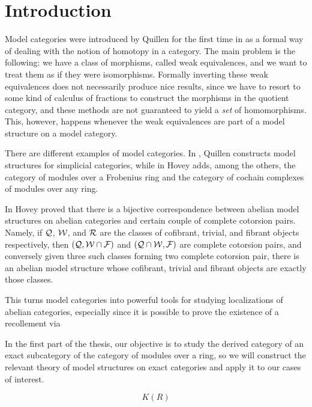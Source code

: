\chapter{Introduction}\label{ch:introduction}

Model categories were introduced by Quillen for the first time in \cite{Q} as a formal way of dealing with the notion of homotopy in a category. The main problem is the following: we have a class of morphisms, called weak equivalences, and we want to treat them as if they were isomorphisms. Formally inverting these weak equivalences does not necessarily produce nice results, since we have to resort to some kind of calculus of fractions to construct the morphisms in the quotient category, and these methods are not guaranteed to yield a \emph{set} of homomorphisms. This, however, happens whenever the weak equivalences are part of a model structure on a model category.

There are different examples of model categories. In \cite{Q}, Quillen constructs model structures for simplicial categories, while in \cite{Hov99} Hovey adds, among the others, the category of modules over a Frobenius ring and the category of cochain complexes of modules over any ring.

In \cite{Hov02} Hovey proved that there is a bijective correspondence between abelian model structures on abelian categories and certain couple of complete cotorsion pairs. Namely, if $\mathcal{Q}$, $\mathcal{W}$, and $\mathcal{R}$ are the classes of cofibrant, trivial, and fibrant objects respectively, then $(\mathcal{Q},\mathcal{W}\cap\mathcal{F})$ and $(\mathcal{Q}\cap\mathcal{W},\mathcal{F})$ are complete cotorsion pairs, and conversely given three such classes forming two complete cotorsion pair, there is an abelian model structure whose cofibrant, trivial and fibrant objects are exactly those classes.

This turns model categories into powerful tools for studying localizations of abelian categories, especially since it is possible to prove the existence of a recollement via

In the first part of the thesis, our objective is to study the derived category of an exact subcategory of the category of modules over a ring, so we will construct the relevant theory of model structures on exact categories and apply it to our cases of interest.

\begin{equation}
K(R)
\end{equation}

